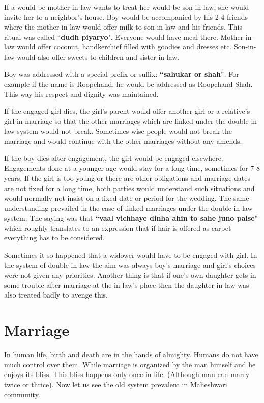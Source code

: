 If a would-be mother-in-law wants to treat her would-be son-in-law, she would
invite her to a neighbor's house. Boy would be accompanied by his 2-4 friends
where the mother-in-law would offer milk to son-in-law and his friends. This
ritual was called ``\textbf{dudh piyaryo}". Everyone would have meal there.
Mother-in-law would offer coconut, handkerchief filled with goodies and dresses
etc. Son-in-law would also offer sweets to children and sister-in-law. 

Boy was addressed with a special prefix or suffix: \textbf{``sahukar or
shah"}. For example if the name is Roopchand, he would be addressed as
Roopchand Shah. This way his respect and dignity was maintained.

If the engaged girl dies, the girl's parent would offer another girl or a
relative's girl in marriage so that the other marriages which are linked under
the double in-law system would not break. Sometimes wise people would not break
the marriage and would continue with the other marriages without any amends.

If the boy dies after engagement, the girl would be engaged elsewhere.
Engagements done at a younger age would stay for a long  time, sometimes for
7-8 years. If the girl is too young or there are other obligations and marriage
dates are not fixed for a long time, both parties would understand such
situations and would normally not insist on a fixed date or period for the
wedding. The same understanding prevailed in the case of linked marriages under
the double in-law system. The saying was that \textbf{``vaal vichhaye dinha
ahin to sahe juno paise"} which roughly translates to an expression that if
hair is offered as carpet everything has to be considered.

Sometimes it so happened that a widower would have to be engaged with
girl. In the system of double in-law the aim was always boy's marriage and
girl's choices were not given any priorities. Another thing is that if one's
own daughter gets in some trouble after marriage at the in-law's place then the
daughter-in-law was also treated badly to avenge this.

\section{Marriage}
In human life, birth and death are in the hands of almighty. Humans do not have
much control over them. While marriage is organized by the man himself and he
enjoys its bliss. This bliss happens only once in life. (Although man can marry
twice or thrice). Now let us see the old system prevalent in Maheshwari
community.

